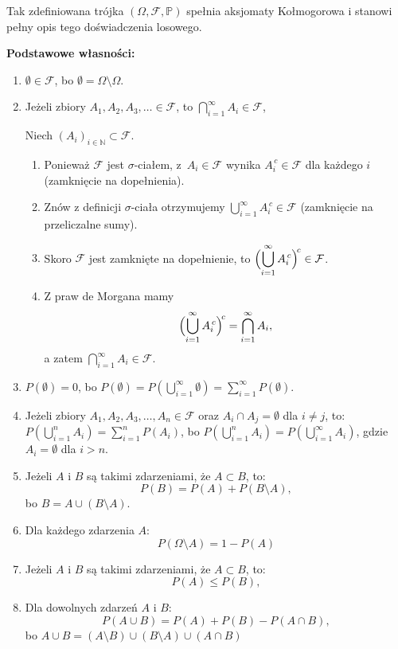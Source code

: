 \documentclass[final,a4paper,openany,12pt]{mwbk}
\begin{document}
Tak zdefiniowana trójka \((\Omega,\mathcal{F},\mathbb{P})\)
spełnia aksjomaty Kołmogorowa i stanowi pełny opis tego doświadczenia losowego.


\vspace{3mm}

\noindent\textbf{Podstawowe własności:}
\begin{enumerate}
    \item $\emptyset \in \mathcal{F}$, bo $\emptyset = \Omega \setminus \Omega$.

    \item Jeżeli zbiory $A_1, A_2, A_3, \dots \in \mathcal{F}$, to $\bigcap_{i=1}^{\infty} A_i \in \mathcal{F}$, 


Niech $(A_i)_{i\in\mathbb N}\subset\mathcal F$.
\begin{enumerate}
  \item Ponieważ $\mathcal F$ jest $\sigma$-ciałem, z~$A_i\in\mathcal F$ wynika 
        $A_i^{\,c}\in\mathcal F$ dla każdego $i$ (zamknięcie na dopełnienia).
  \item Znów z definicji $\sigma$-ciała otrzymujemy 
        $\displaystyle\bigcup_{i=1}^\infty A_i^{\,c}\in\mathcal F$
        (zamknięcie na przeliczalne sumy).
  \item Skoro $\mathcal F$ jest zamknięte na dopełnienie, to
        $\displaystyle\Bigl(\bigcup_{i=1}^\infty A_i^{\,c}\Bigr)^{\!c}\in\mathcal F$.
  \item Z praw de Morgana mamy
        \[
          \Bigl(\bigcup_{i=1}^\infty A_i^{\,c}\Bigr)^{\!c}
          =\bigcap_{i=1}^\infty A_i,
        \]
        a zatem $\displaystyle\bigcap_{i=1}^\infty A_i\in\mathcal F$.
\end{enumerate}

    \item $P(\emptyset) = 0$, bo $P(\emptyset) = P\left(\bigcup_{i=1}^{\infty} \emptyset\right) = \sum_{i=1}^{\infty} P(\emptyset)$.

    \item Jeżeli zbiory $A_1, A_2, A_3, \dots, A_n \in \mathcal{F}$ oraz $A_i \cap A_j = \emptyset$ dla $i \neq j$, to:
    $P\left(\bigcup_{i=1}^{n} A_i\right) = \sum_{i=1}^{n} P(A_i)$, bo $P\left(\bigcup_{i=1}^{n} A_i\right) = P\left(\bigcup_{i=1}^{\infty} A_i\right)$, gdzie $A_i = \emptyset$ dla $i > n$.

    \item Jeżeli $A$ i $B$ są takimi zdarzeniami, że $A \subset B$, to:
    \[ P(B) = P(A) + P(B \setminus A), \] bo $B = A \cup (B \setminus A)$.

    \item Dla każdego zdarzenia $A$: \[ P(\Omega\setminus A) = 1 - P(A) \]

    \item Jeżeli $A$ i $B$ są takimi zdarzeniami, że $A \subset B$, to:
    \[ P(A) \leq P(B), \]

    \item Dla dowolnych zdarzeń $A$ i $B$:
    \[ P(A \cup B) = P(A) + P(B) - P(A \cap B), \] bo $A \cup B = (A \setminus B) \cup (B \setminus A) \cup (A \cap B)$
\end{enumerate}
\end{document}

